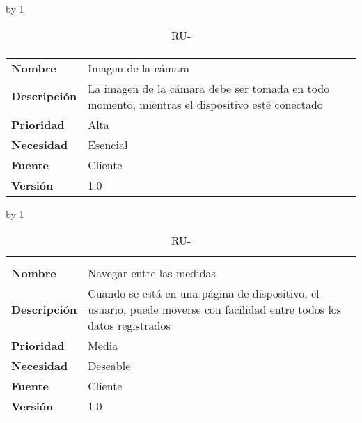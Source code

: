 \advance\ru by 1
\begin{table}[H]
	\caption{RU-\number\ru}
	\begin{tabular}{|l|p{}|}
		\hline
		\multicolumn{2}{|c|}{\cellcolor[HTML]{BFBFBF}{\color[HTML]{000000} \textbf{RU-\number\ru}}} \\ \hline
		\textbf{Nombre}      & Imagen de la cámara                                                                            \\ \hline
		\textbf{Descripción} & La imagen de la cámara debe ser tomada en todo momento, mientras el dispositivo esté conectado \\ \hline
		\textbf{Prioridad}   & Alta                                                                                           \\ \hline
		\textbf{Necesidad}   & Esencial                                                                                       \\ \hline
		\textbf{Fuente}      & Cliente                                                                                        \\ \hline
		\textbf{Versión}     & 1.0                                                                                            \\ \hline
	\end{tabular}
\end{table}
\advance\ru by 1
\begin{table}[H]
	\caption{RU-\number\ru}
	\begin{tabular}{|l|p{}|}
		\hline
		\multicolumn{2}{|c|}{\cellcolor[HTML]{BFBFBF}{\color[HTML]{000000} \textbf{RU-\number\ru}}} \\ \hline
		\textbf{Nombre}      & Navegar entre las medidas                                                                                                   \\ \hline
		\textbf{Descripción} & Cuando se está en una página de dispositivo, el usuario, puede moverse con facilidad entre todos los datos registrados \\ \hline
		\textbf{Prioridad}   & Media                                                                                                                       \\ \hline
		\textbf{Necesidad}   & Deseable                                                                                                                    \\ \hline
		\textbf{Fuente}      & Cliente                                                                                                                     \\ \hline
		\textbf{Versión}     & 1.0                                                                                                                         \\ \hline
	\end{tabular}
\end{table}
